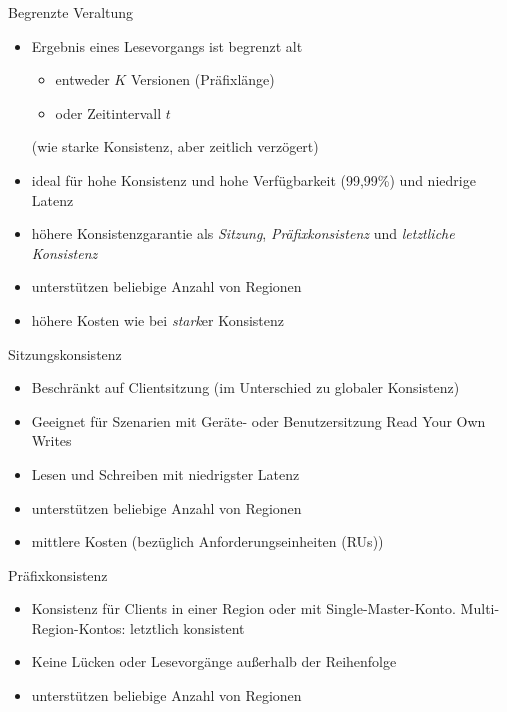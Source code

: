 \begin{flashcard}[Definition]{Begrenzte Veraltung}
    \begin{itemize}
        \item Ergebnis eines Lesevorgangs ist begrenzt alt
            \begin{itemize}
                \item entweder $K$ Versionen (Präfixlänge)
                \item oder Zeitintervall $t$
            \end{itemize}
            (wie starke Konsistenz, aber zeitlich verzögert)
        \item ideal für hohe Konsistenz und hohe Verfügbarkeit (99,99\%) und niedrige Latenz
        \item höhere Konsistenzgarantie als \emph{Sitzung}, \emph{Präfixkonsistenz} und \emph{letztliche Konsistenz}
        \item unterstützen beliebige Anzahl von Regionen
        \item höhere Kosten wie bei \emph{stark}er Konsistenz
    \end{itemize}
\end{flashcard}

\begin{flashcard}[Definition]{Sitzungskonsistenz}
    \begin{itemize}
        \item Beschränkt auf Clientsitzung (im Unterschied zu globaler Konsistenz)
        \item Geeignet für Szenarien mit Geräte- oder Benutzersitzung\newline
            Read Your Own Writes
        \item Lesen und Schreiben mit niedrigster Latenz
        \item unterstützen beliebige Anzahl von Regionen
        \item mittlere Kosten (bezüglich Anforderungseinheiten (RUs))
    \end{itemize}
\end{flashcard}

\begin{flashcard}[Definition]{Präfixkonsistenz}
    \begin{itemize}
        \item Konsistenz für Clients in einer Region oder mit Single-Master-Konto. Multi-Region-Kontos: letztlich konsistent
        \item Keine Lücken oder Lesevorgänge außerhalb der Reihenfolge
        \item unterstützen beliebige Anzahl von Regionen
    \end{itemize}
\end{flashcard}

